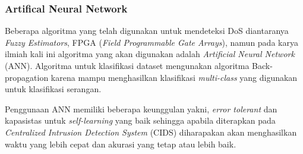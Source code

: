 \subsubsection{Artifical Neural Network}
    Beberapa algoritma yang telah digunakan untuk mendeteksi DoS diantaranya \textit{Fuzzy Estimators}, FPGA (\textit{Field Programmable Gate Arrays}), namun pada karya ilmiah kali ini algoritma yang akan digunakan adalah \textit{Artificial Neural Network} (ANN). Algoritma untuk klasifikasi dataset mengunakan algoritma Back-propagation karena mampu menghasilkan klasifikasi \textit{multi-class}\cite{fiturPCA} yang digunakan untuk klasifikasi serangan.
    
    Penggunaan ANN memiliki beberapa keunggulan yakni, \textit{error tolerant} dan kapasistas untuk \textit{self-learning} yang baik\cite{ann_advantages} sehingga apabila diterapkan pada \textit{Centralized Intrusion Detection System} (CIDS) diharapakan akan menghasilkan waktu yang lebih cepat dan akurasi yang tetap atau lebih baik.
    

